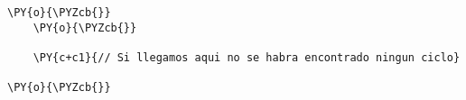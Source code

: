 \begin{Verbatim}[commandchars=\\\{\}]
		\PY{o}{\PYZcb{}}
	\PY{o}{\PYZcb{}}

    \PY{c+c1}{// Si llegamos aqui no se habra encontrado ningun ciclo}

\PY{o}{\PYZcb{}}
\end{Verbatim}
